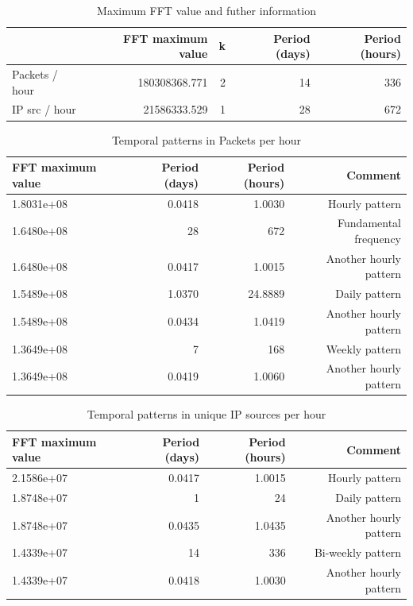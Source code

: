 \documentclass{article}
\begin{document}
\begin{table}[h]
    \centering
    \begin{tabular}{l|r|r|r|r}
                       & FFT maximum value & k & Period (days) & Period (hours) \\
        \hline
        Packets / hour & 180308368.771 & 2 & 14 & 336 \\
        IP src / hour & 21586333.529 & 1 & 28 & 672 \\
    \end{tabular}
    \caption{\label{table:rep-21-max-fft} Maximum FFT value and futher information}
\end{table}

\begin{table}[H]
    \centering
    \begin{tabular}{l|r|r|r}
        FFT maximum value & Period (days) & Period (hours) & Comment \\
        \hline
        1.8031e+08 & 0.0418 & 1.0030 & Hourly pattern \\
        1.6480e+08 & 28 & 672 & Fundamental frequency \\
        1.6480e+08 & 0.0417 & 1.0015 & Another hourly pattern \\
        1.5489e+08 & 1.0370 & 24.8889 & Daily pattern \\
        1.5489e+08 & 0.0434 & 1.0419 & Another hourly pattern \\
        1.3649e+08 & 7 & 168 & Weekly pattern \\
        1.3649e+08 & 0.0419 & 1.0060 &  Another hourly pattern \\
    \end{tabular}
    \caption{\label{table:rep-21-fft-packets} Temporal patterns in Packets per hour}
\end{table}

\begin{table}[H]
    \centering
    \begin{tabular}{l|r|r|r}
        FFT maximum value & Period (days) & Period (hours) & Comment \\
        \hline
        2.1586e+07 & 0.0417 & 1.0015 & Hourly pattern \\
        1.8748e+07 & 1 & 24 & Daily pattern \\
        1.8748e+07 & 0.0435 &  1.0435 & Another hourly pattern \\
        1.4339e+07 & 14 &  336 & Bi-weekly pattern \\
        1.4339e+07 & 0.0418&  1.0030 & Another hourly pattern \\
    \end{tabular}
    \caption{\label{table:rep-21-fft-ips} Temporal patterns in unique IP sources per hour}
\end{table}
\end{document}
